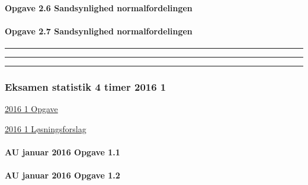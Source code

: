 \documentclass[]{book}
\let\oldparagraph\paragraph
\renewcommand{\paragraph}[1]{\oldparagraph{#1}\mbox{}}
\begin{document}
\hypertarget{opgave-2.6-sandsynlighed-normalfordelingen}{%
\paragraph{Opgave 2.6 Sandsynlighed
normalfordelingen}\label{opgave-2.6-sandsynlighed-normalfordelingen}}

\hypertarget{opgave-2.7-sandsynlighed-normalfordelingen}{%
\paragraph{Opgave 2.7 Sandsynlighed
normalfordelingen}\label{opgave-2.7-sandsynlighed-normalfordelingen}}

\begin{center}\rule{0.5\linewidth}{\linethickness}\end{center}

\begin{center}\rule{0.5\linewidth}{\linethickness}\end{center}

\begin{center}\rule{0.5\linewidth}{\linethickness}\end{center}

\hypertarget{eksamen-statistik-4-timer-2016-1}{%
\subsubsection{Eksamen statistik 4 timer 2016
1}\label{eksamen-statistik-4-timer-2016-1}}

\href{https://www.dropbox.com/s/t1h9o0xnutneavu/AU\%20Statistik\%20eksamensopgave\%20-\%20januar\%202016.pdf?dl=1}{2016
1 Opgave}

\href{https://www.dropbox.com/s/vk2igqyofts6fes/AU\%20Statistik\%20eksamensopgave\%20-\%20januar\%202016\%20l\%C3\%B8sningsforslag.docx?dl=1}{2016
1 Løsningsforslag}

\hypertarget{au-januar-2016-opgave-1.1}{%
\paragraph{AU januar 2016 Opgave 1.1}\label{au-januar-2016-opgave-1.1}}

\hypertarget{au-januar-2016-opgave-1.2}{%
\paragraph{AU januar 2016 Opgave 1.2}\label{au-januar-2016-opgave-1.2}}
\end{document}
